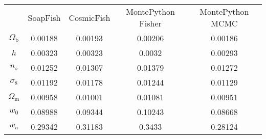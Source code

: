 \begin{table}
\centering
\begin{tabular}{|c|c|c|c|c|}
{} & {SoapFish} & {CosmicFish} & {MontePython Fisher} & {MontePython MCMC} \\
$\Omega_\mathrm{b}$ & 0.00188 & 0.00193 & 0.00206 & 0.00186 \\
$h$ & 0.00323 & 0.00323 & 0.0032 & 0.00293 \\
$n_s$ & 0.01252 & 0.01307 & 0.01379 & 0.01272 \\
$\sigma_8$ & 0.01192 & 0.01178 & 0.01244 & 0.01129 \\
$\Omega_\mathrm{m}$ & 0.00958 & 0.01001 & 0.01081 & 0.00951 \\
$w_0$ & 0.08988 & 0.09344 & 0.10243 & 0.08668 \\
$w_a$ & 0.29342 & 0.31183 & 0.3433 & 0.28124 \\
\end{tabular}
\end{table}

